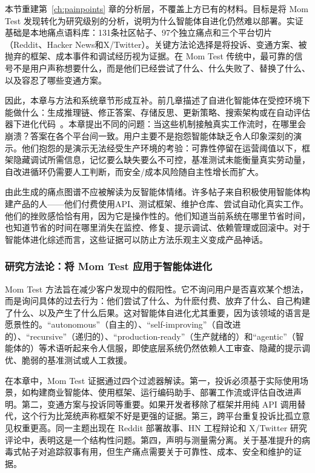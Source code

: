 本节重建第~\ref{ch:painpoints} 章的分析层，不覆盖上方已有的材料。目标是将 Mom Test 发现转化为研究级别的分析，说明为什么智能体自进化仍然难以部署。实证基础是本地痛点语料库：131条社区帖子、97个独立痛点和三个平台切片（Reddit、Hacker News和X/Twitter）。关键方法论选择是将投诉、变通方案、被抛弃的框架、成本事件和调试经历视为证据。在 Mom Test 传统中，最可靠的信号不是用户声称想要什么，而是他们已经尝试了什么、什么失败了、替换了什么、以及容忍了哪些变通方案。

因此，本章与方法和系统章节形成互补。前几章描述了自进化智能体在受控环境下能做什么：生成推理链、修正答案、存储反思、更新策略、搜索架构或在自动评估器下进化代码~\cite{reflexion2023,adas2025,darwingodelmachine2025}。本章提出不同的问题：当这些机制接触真实工作流时，在哪里会崩溃？答案在各个平台间一致。用户主要不是抱怨智能体缺乏令人印象深刻的演示。他们抱怨的是演示无法经受生产环境的考验：可靠性停留在运营阈值以下，框架隐藏调试所需信息，记忆要么缺失要么不可控，基准测试未能衡量真实劳动量，自改进循环仍需要人工判断，而安全/成本风险随自主性增长而扩大。

由此生成的痛点图谱不应被解读为反智能体情绪。许多帖子来自积极使用智能体构建产品的人——他们付费使用API、测试框架、维护仓库、尝试自动化真实工作。他们的挫败感恰恰有用，因为它是操作性的。他们知道当前系统在哪里节省时间，也知道节省的时间在哪里消失在监控、修复、提示调试、依赖管理或回滚中。对于智能体进化综述而言，这些证据可以防止方法乐观主义变成产品神话。

\subsubsection{研究方法论：将 Mom Test 应用于智能体进化}
\label{sec:ch7-methodology-english}

Mom Test 方法旨在减少客户发现中的假阳性。它不询问用户是否喜欢某个想法，而是询问具体的过去行为：他们尝试了什么、为什麽付费、放弃了什么、自己构建了什么、以及产生了什么后果。这对智能体自进化尤其重要，因为该领域的语言是愿景性的。``autonomous''（自主的）、``self-improving''（自改进的）、``recursive''（递归的）、``production-ready''（生产就绪的）和``agentic''（智能体的）等术语听起来令人信服，即使底层系统仍然依赖人工审查、隐藏的提示调优、脆弱的基准测试或人工救援。

在本章中，Mom Test 证据通过四个过滤器解读。第一，投诉必须基于实际使用场景，如构建商业智能体、使用框架、运行编码助手、部署工作流或评估自改进声明。第二，变通方案与投诉同等重要。如果开发者移除了框架并用纯 API 调用替代，这个行为比笼统声称框架不好是更强的证据。第三，跨平台重复投诉比孤立意见权重更高。同一主题出现在 Reddit 部署故事、HN 工程辩论和 X/Twitter 研究评论中，表明这是一个结构性问题。第四，声明与测量需分离。关于基准提升的病毒式帖子对追踪叙事有用，但生产痛点需要关于可靠性、成本、安全和维护的证据。

